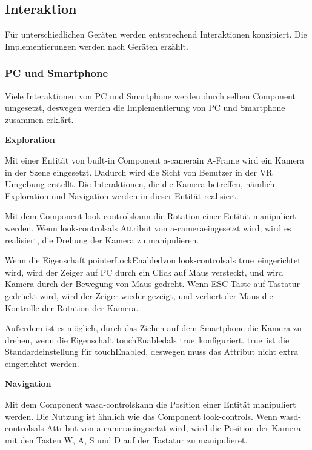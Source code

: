  \subsection{Interaktion}
  Für unterschiedlichen Geräten werden entsprechend Interaktionen konzipiert. Die Implementierungen werden nach Geräten erzählt.
  
  \subsubsection{PC und Smartphone}
  Viele Interaktionen von PC und Smartphone werden durch selben Component umgesetzt, deswegen werden die Implementierung von PC und Smartphone zusammen erklärt.
  
  \textbf{Exploration}
  
  Mit einer Entität von built-in Component \glqq a-camera\grqq in A-Frame wird ein Kamera in der Szene eingesetzt. Dadurch wird die Sicht von Benutzer in der VR Umgebung erstellt. Die Interaktionen, die die Kamera betreffen, nämlich Exploration und Navigation werden in dieser Entität realisiert.
  
  Mit dem Component \glqq look-controls\grqq kann die Rotation einer Entität manipuliert werden. Wenn \grqq look-controls\grqq als Attribut von \glqq a-camera\grqq eingesetzt wird, wird es realisiert, die Drehung der Kamera zu manipulieren.
  
  Wenn die Eigenschaft \glqq pointerLockEnabled\grqq von \glqq look-controls\grqq  als \glqq true\grqq\ eingerichtet wird, wird der Zeiger auf PC durch ein Click auf Maus versteckt, und wird Kamera durch der Bewegung von Maus gedreht. Wenn ESC Taste auf Tastatur gedrückt wird, wird der Zeiger wieder gezeigt, und verliert der Maus die Kontrolle der Rotation der Kamera.
  
  Außerdem ist es möglich, durch das Ziehen auf dem Smartphone die Kamera zu drehen, wenn die Eigenschaft \glqq touchEnabled\grqq als \glqq true\grqq\ konfiguriert. \glqq true\grqq\ ist die Standardeinstellung für \glqq touchEnabled\grqq, deswegen muss das Attribut nicht extra eingerichtet werden.
  
  \textbf{Navigation}
  
  Mit dem Component \glqq wasd-controls\grqq kann die Position einer Entität manipuliert werden. Die Nutzung ist ähnlich wie das Component \glqq look-controls\grqq. Wenn \grqq wasd-controls\grqq als Attribut von \glqq a-camera\grqq eingesetzt wird, wird die Position der Kamera mit den Tasten W, A, S und D auf der Tastatur zu manipulieret.
  
